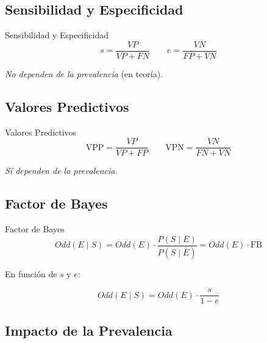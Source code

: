 \documentclass[
  ignorenonframetext,
  aspectratio=169,
]{beamer}
\begin{document}
\begin{frame}
\end{frame}

\subsection{Sensibilidad y
Especificidad}\label{sensibilidad-y-especificidad}

\begin{frame}{Sensibilidad y Especificidad}
\[s = \frac{VP}{VP+FN} \qquad e = \frac{VN}{FP+VN}\]

\emph{No dependen de la prevalencia} (en teoría).
\end{frame}

\begin{frame}
\end{frame}

\subsection{Valores Predictivos}\label{valores-predictivos}

\begin{frame}{Valores Predictivos}
\[\text{VPP} = \frac{VP}{VP+FP} \qquad \text{VPN} = \frac{VN}{FN+VN}\]

\emph{Sí dependen de la prevalencia.}
\end{frame}

\begin{frame}
\end{frame}

\subsection{Factor de Bayes}\label{factor-de-bayes}

\begin{frame}{Factor de Bayes}
\[Odd(E \mid S) = Odd(E) \cdot \frac{P(S \mid E)}{P(S \mid \bar{E})} = Odd(E) \cdot \text{FB}\]

En función de \(s\) y \(e\):

\[Odd(E \mid S) = Odd(E) \cdot \frac{s}{1-e}\]
\end{frame}

\begin{frame}
\end{frame}

\subsection{Impacto de la Prevalencia}\label{impacto-de-la-prevalencia}
\end{document}
